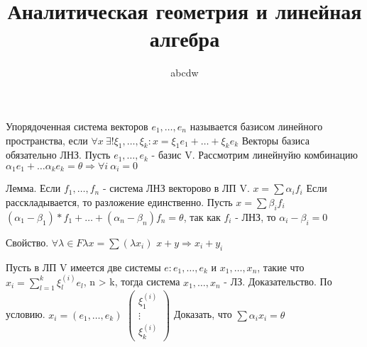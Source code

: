 \documentclass[12pt]{article}
\title{Аналитическая геометрия и линейная алгебра}
\date{}
\author{abcdw}
\begin{document}
    \maketitle
    Упорядоченная система векторов $e_1, \dots, e_n$ называется базисом линейного пространства, если $\forall x\  \exists! \xi_1, \dots, \xi_k: x = \xi_1 e_1 + \dots + \xi_k e_k$ \newline
    Векторы базиса обязательно ЛНЗ. \newline
    Пусть $e_1, \dots, e_k$ - базис V. \newline
    Рассмотрим линейнуйю комбинацию $\alpha_1 e_1 + \dots \alpha_k e_k = \theta \Rightarrow \forall i\  \alpha_i = 0$
    
    Лемма. Если $f_1, \dots, f_n$ - система ЛНЗ векторово в ЛП V. \newline
    $x = \sum \alpha_i f_i$ \newline
    Если расскладывается, то разложение единственно. \newline   
    Пусть $x = \sum \beta_i f_i$ \newline
    $(\alpha_1 - \beta_1) * f_1 + \dots + (\alpha_n - \beta_n) f_n = \theta$, так как $f_i$ - ЛНЗ, то $\alpha_i - \beta_i = 0$ \newline
    
    Свойство. \newline
    $\forall \lambda \in F \lambda x = \sum (\lambda x_i)$ \newline
    $x + y \Rightarrow x_i + y_i$ \newline

    Пусть в ЛП V имеется две системы $e: e_1, \dots, e_k$ и $x_1, \dots, x_n$, такие что $x_i = \sum\limits_{l = 1}^k \xi_l^{(i)} e_l$, n > k, тогда система $x_1, \dots, x_n$ - ЛЗ. \newline
    Доказательство. \newline
    По условию. $x_i = (e_1, \dots, e_k)$
    $\begin{pmatrix} 
        \xi_1^{(i)} \\
        \vdots \\
        \xi_k^{(i)}
    \end{pmatrix}$ \newline
    Доказать, что $\sum \alpha_i x_i = \theta$ \newline 
    
\end{document}
